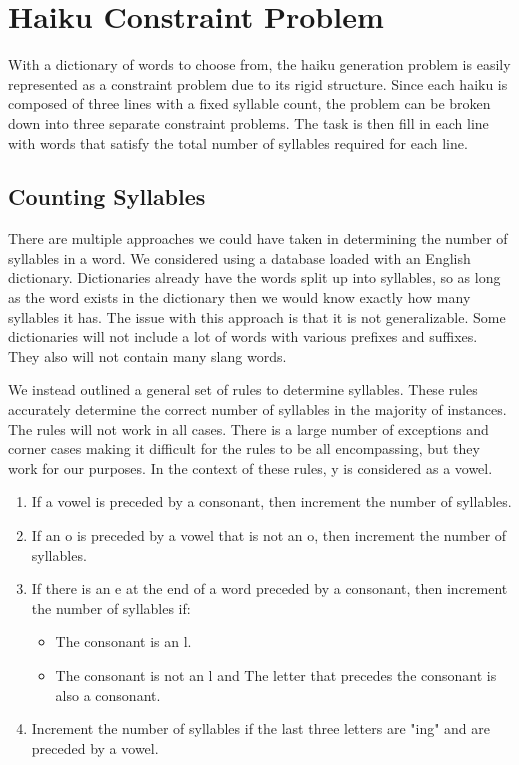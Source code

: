 \documentclass[]{article}
\begin{document}
\section{Haiku Constraint Problem}
With a dictionary of words to choose from, the haiku generation problem is easily represented as a constraint problem due to its rigid structure. Since each haiku is composed of three lines with a fixed syllable count, the problem can be broken down into three separate constraint problems. The task is then fill in each line with words that satisfy the total number of syllables required for each line.

\subsection{Counting Syllables}
There are multiple approaches we could have taken in determining the number of syllables in a word. We considered using a database loaded with an English dictionary. Dictionaries already have the words split up into syllables, so as long as the word exists in the dictionary then we would know exactly how many syllables it has. The issue with this approach is that it is not generalizable. Some dictionaries will not include a lot of words with various prefixes and suffixes. They also will not contain many slang words.

We instead outlined a general set of rules to determine syllables. These rules accurately determine the correct number of syllables in the majority of instances. The rules will not work in all cases. There is a large number of exceptions and corner cases making it difficult for the rules to be all encompassing, but they work for our purposes. In the context of these rules, y is considered as a vowel\cite{syllables}.
\begin{enumerate}
	\item If a vowel is preceded by a consonant, then increment the number of syllables.
	\item If an o is preceded by a vowel that is not an o, then increment the number of syllables.
	\item If there is an e at the end of a word preceded by a consonant, then increment the number of syllables if:
	\begin{itemize}
		\item The consonant is an l.
		\item The consonant is not an l and The letter that precedes the consonant is also a consonant.
	\end{itemize}
	\item Increment the number of syllables if the last three letters are "ing" and are preceded by a vowel.
\end{enumerate}
\end{document}
